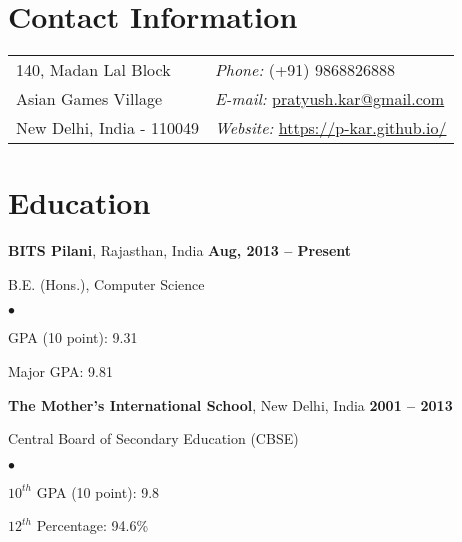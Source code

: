 \documentclass[margin,line]{res}
\newenvironment{list1}{
  \begin{list}{\ding{113}}{%
      \setlength{\itemsep}{0in}
      \setlength{\parsep}{0in} \setlength{\parskip}{0in}
      \setlength{\topsep}{0in} \setlength{\partopsep}{0in} 
      \setlength{\leftmargin}{0.17in}}}{\end{list}}
\newenvironment{list2}{
  \begin{list}{$\bullet$}{%
      \setlength{\itemsep}{0in}
      \setlength{\parsep}{0in} \setlength{\parskip}{0in}
      \setlength{\topsep}{0in} \setlength{\partopsep}{0in} 
      \setlength{\leftmargin}{0.2in}}}{\end{list}}
\begin{document}

\begin{resume}
\section{\sc Contact Information}
\vspace{.05in}
\begin{tabular}{@{}p{2in}p{4in}}
140, Madan Lal Block        & {\it Phone:} (+91) 9868826888 \\            
Asian Games Village         & {\it E-mail:} \href{mailto:pratyush.kar@gmail.com}{pratyush.kar@gmail.com} \\         
New Delhi, India - 110049   & {\it Website:} \href{https://p-kar.github.io/}{https://p-kar.github.io/} \\    
\end{tabular}



\section{\sc Education}
{\bf BITS Pilani}, Rajasthan, India \hfill {\bf Aug, 2013 -- Present}\\
\vspace*{-.1in}
\begin{list1}
\item[] B.E. (Hons.), Computer Science
\begin{list2}
\vspace*{.05in}
\item GPA (10 point): 9.31
\item Major GPA: 9.81
\end{list2}
\vspace*{.05in}
\end{list1}

{\bf The Mother's International School}, New Delhi, India \hfill {\bf 2001 -- 2013}\\
\vspace*{-.1in}
\begin{list1}
\item[] Central Board of Secondary Education (CBSE)
\begin{list2}
\vspace*{.05in}
\item $10^{th}$ GPA (10 point): 9.8
\item $12^{th}$ Percentage: 94.6\%
\end{list2}
\vspace*{.05in}
\end{list1}



\end{resume}
\end{document}
